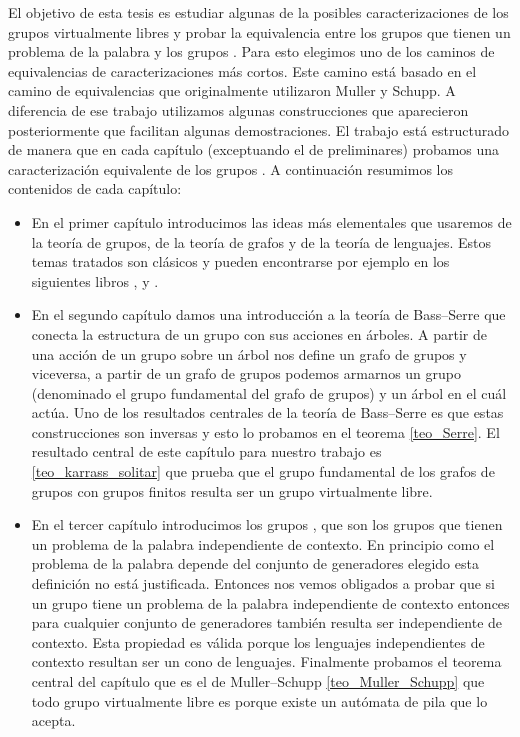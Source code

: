 \documentclass[tesis.tex]{subfiles}
\begin{document}
	El objetivo de esta tesis es estudiar algunas de la posibles caracterizaciones de los grupos virtualmente libres y probar la equivalencia entre los grupos que tienen un problema de la palabra \ic y los grupos \vls.
	Para esto elegimos uno de los caminos de equivalencias de caracterizaciones más cortos.
	Este camino está basado en el camino de equivalencias que originalmente utilizaron Muller y Schupp.
	A diferencia de ese trabajo utilizamos algunas construcciones que aparecieron posteriormente que facilitan algunas demostraciones.
	El trabajo está estructurado de manera que en cada capítulo (exceptuando el de preliminares) probamos una caracterización equivalente de los grupos \vls.
	A continuación resumimos los contenidos de cada capítulo:
	\begin{itemize}
		\item 
			En el primer capítulo introducimos las ideas más elementales que usaremos de la teoría de grupos, de la teoría de grafos y de la teoría de lenguajes.
			Estos temas tratados son clásicos y pueden encontrarse por ejemplo en los siguientes libros \cite{lyndon1977combinatorial}, \cite{diestel2005graph} y \cite{hopcraft-ullman}.
		
		\item 
			En el segundo capítulo damos una introducción a la teoría de Bass--Serre que conecta la estructura de un grupo con sus acciones en árboles.
			A partir de una acción de un grupo sobre un árbol nos define un grafo de grupos y viceversa, a partir de un grafo de grupos podemos armarnos un grupo (denominado el grupo fundamental del grafo de grupos) y un árbol en el cuál actúa.
			Uno de los resultados centrales de la teoría de Bass--Serre es que estas construcciones son inversas y esto lo probamos en el teorema \ref{teo_Serre}.
			El resultado central de este capítulo para nuestro trabajo es \ref{teo_karrass_solitar} que prueba que el grupo fundamental de los grafos de grupos con grupos finitos resulta ser un grupo virtualmente libre.

		\item 
			En el tercer capítulo introducimos los grupos \ic, que son los grupos que tienen un problema de la palabra independiente de contexto. 
			En principio como el problema de la palabra depende del conjunto de generadores elegido esta definición no está justificada.
			Entonces nos vemos obligados a probar que si un grupo tiene un problema de la palabra independiente de contexto entonces para cualquier conjunto de generadores también resulta ser independiente de contexto.
			Esta propiedad es válida porque los lenguajes independientes de contexto resultan ser un cono de lenguajes.
			Finalmente probamos el teorema central del capítulo que es el de Muller--Schupp \ref{teo_Muller_Schupp} que todo grupo virtualmente libre es \ic porque existe un autómata de pila que lo acepta. 
			

\end{itemize}
\end{document}
